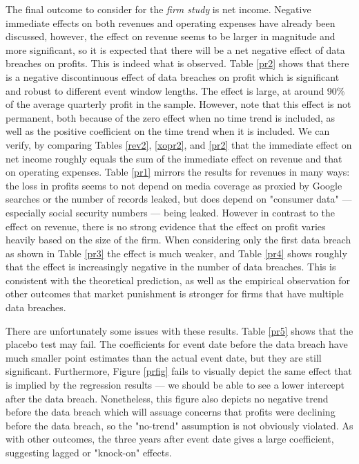 \documentclass[../Main.tex]{subfiles}
\begin{document}
The final outcome to consider for the \textit{firm study} is net income. Negative immediate effects on both revenues and operating expenses have already been discussed, however, the effect on revenue seems to be larger in magnitude and more significant, so it is expected that there will be a net negative effect of data breaches on profits. This is indeed what is observed. Table \ref{pr2} shows that there is a negative discontinuous effect of data breaches on profit which is significant and robust to different event window lengths. The effect is large, at around 90\% of the average quarterly profit in the sample. However, note that this effect is not permanent, both because of the zero effect when no time trend is included, as well as the positive coefficient on the time trend when it is included. We can verify, by comparing Tables \ref{rev2}, \ref{xopr2}, and \ref{pr2} that the immediate effect on net income roughly equals the sum of the immediate effect on revenue and that on operating expenses. Table \ref{pr1} mirrors the results for revenues in many ways: the loss in profits seems to not depend on media coverage as proxied by Google searches or the number of records leaked, but does depend on "consumer data" --- especially social security numbers --- being leaked. However in contrast to the effect on revenue, there is no strong evidence that the effect on profit varies heavily based on the size of the firm. When considering only the first data breach as shown in Table \ref{pr3} the effect is much weaker, and Table \ref{pr4} shows roughly that the effect is increasingly negative in the number of data breaches. This is consistent with the theoretical prediction, as well as the empirical observation for other outcomes that market punishment is stronger for firms that have multiple data breaches.

There are unfortunately some issues with these results. Table \ref{pr5} shows that the placebo test may fail. The coefficients for event date before the data breach have much smaller point estimates than the actual event date, but they are still significant. Furthermore, Figure \ref{prfig} fails to visually depict the same effect that is implied by the regression results --- we should be able to see a lower intercept after the data breach. Nonetheless, this figure also depicts no negative trend before the data breach which will assuage concerns that profits were declining before the data breach, so the "no-trend" assumption is not obviously violated. As with other outcomes, the three years after event date gives a large coefficient, suggesting lagged or "knock-on" effects. 
\end{document}
